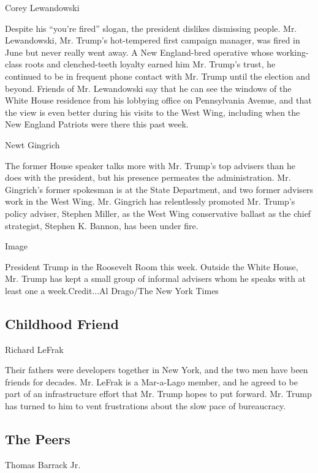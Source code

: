 Corey Lewandowski

Despite his ``you're fired'' slogan, the president dislikes dismissing
people. Mr. Lewandowski, Mr. Trump's hot-tempered first campaign
manager, was fired in June but never really went away. A New
England-bred operative whose working-class roots and clenched-teeth
loyalty earned him Mr. Trump's trust, he continued to be in frequent
phone contact with Mr. Trump until the election and beyond. Friends of
Mr. Lewandowski say that he can see the windows of the White House
residence from his lobbying office on Pennsylvania Avenue, and that the
view is even better during his visits to the West Wing, including when
the New England Patriots were there this past week.

Newt Gingrich

The former House speaker talks more with Mr. Trump's top advisers than
he does with the president, but his presence permeates the
administration. Mr. Gingrich's former spokesman is at the State
Department, and two former advisers work in the West Wing. Mr. Gingrich
has relentlessly promoted Mr. Trump's policy adviser, Stephen Miller, as
the West Wing conservative ballast as the chief strategist, Stephen K.
Bannon, has been under fire.

Image

President Trump in the Roosevelt Room this week. Outside the White
House, Mr. Trump has kept a small group of informal advisers whom he
speaks with at least one a week.Credit...Al Drago/The New York Times

\hypertarget{childhood-friend}{%
\subsection{Childhood Friend}\label{childhood-friend}}

Richard LeFrak

Their fathers were developers together in New York, and the two men have
been friends for decades. Mr. LeFrak is a Mar-a-Lago member, and he
agreed to be part of an infrastructure effort that Mr. Trump hopes to
put forward. Mr. Trump has turned to him to vent frustrations about the
slow pace of bureaucracy.

\hypertarget{the-peers}{%
\subsection{The Peers}\label{the-peers}}

Thomas Barrack Jr.

